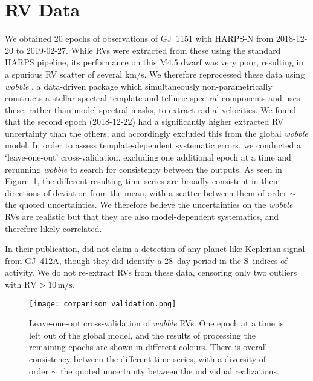 \documentclass[modern]{aastex62}
\begin{document}
\section{RV Data}
\label{sec:k2}

We obtained 20 epochs of observations of GJ~1151 with HARPS-N from 2018-12-20 to 2019-02-27. While RVs were extracted from these using the standard HARPS pipeline, its performance on this M4.5 dwarf was very poor, resulting in a spurious RV scatter of several km/s. We therefore reprocessed these data using \textit{wobble} \citep{wobble}, a data-driven package which simultaneously non-parametrically constructs a stellar spectral template and telluric spectral components and uses these, rather than model spectral masks, to extract radial velocities. We found that the second epoch (2018-12-22) had a significantly higher extracted RV uncertainty than the others, and accordingly excluded this from the global \textit{wobble} model. In order to assess template-dependent systematic errors, we conducted a `leave-one-out' cross-validation, excluding one additional epoch at a time and rerunning \textit{wobble} to search for consistency between the outputs. As seen in Figure~\ref{xvalidation}, the different resulting time series are broadly consistent in their directions of deviation from the mean, with a scatter between them of order $\sim$ the quoted uncertainties. We therefore believe the uncertainties on the \textit{wobble} RVs are realistic but that they are also model-dependent systematics, and therefore likely correlated. 

In their publication, \citet{hires} did not claim a detection of any planet-like Keplerian signal from GJ~412A, though they did identify a 28~day period in the S~indices of activity. We do not re-extract RVs from these data, censoring only two outliers with $\text{RV}>10\,\text{m/s}$.

\begin{figure}
\noindent\texttt{[image: comparison\_validation.png]}

\caption{\label{xvalidation}
Leave-one-out cross-validation of \textit{wobble} RVs. One epoch at a time is left out of the global model, and the results of processing the remaining epochs are shown in different colours. There is overall consistency between the different time series, with a diversity of order $\sim$ the quoted uncertainty between the individual realizations. %
}
\end{figure}
\end{document}
